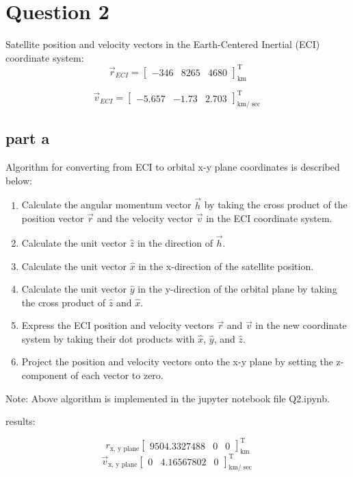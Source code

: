 \section{Question 2}
Satellite position and velocity vectors in the Earth-Centered Inertial (ECI) coordinate system:
$$
\vec{r}_{ECI} = \begin{bmatrix}-346 & 8265 & 4680\end{bmatrix}_{\textrm{km}}^{\textrm{T}}
$$

$$
\vec{v}_{ECI} = \begin{bmatrix}-5.657 & -1.73 & 2.703\end{bmatrix}_{\textrm{km}/\sec}^{\textrm{T}}
$$


\subsection{part a}
Algorithm for converting from ECI to  orbital x-y plane coordinates is described below:
\begin{enumerate}
\item Calculate the angular momentum vector $\vec{h}$ by taking the cross product of the position vector $\vec{r}$ and the velocity vector $\vec{v}$ in the ECI coordinate system.
\item Calculate the unit vector $\hat{z}$ in the direction of $\vec{h}$.
\item Calculate the unit vector $\hat{x}$ in the x-direction of the satellite position.
\item Calculate the unit vector $\hat{y}$ in the y-direction of the orbital plane by taking the cross product of $\hat{z}$ and $\hat{x}$.
\item Express the ECI position and velocity vectors $\vec{r}$ and $\vec{v}$ in the new coordinate system by taking their dot products with $\hat{x}$, $\hat{y}$, and $\hat{z}$.
\item Project the position and velocity vectors onto the x-y plane by setting the z-component of each vector to zero.
\end{enumerate}

Note: Above algorithm is implemented in the jupyter notebook file Q2.ipynb.

results:

$$
r_{\textrm{x, y plane}} \begin{bmatrix}
    9504.3327488 & 0 & 0
\end{bmatrix}_{\textrm{km}}^{\textrm{T}}
$$
$$
\vec{v}_{\textrm{x, y plane}} \begin{bmatrix}
    0 & 4.16567802 & 0
    \end{bmatrix}_{\textrm{km}/\sec}^{\textrm{T}}
$$

